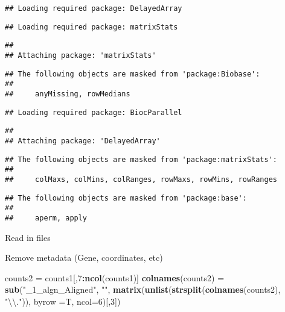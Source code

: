 \documentclass[]{article}
\newenvironment{Shaded}{\begin{snugshade}}{\end{snugshade}}
\newcommand{\KeywordTok}[1]{\textcolor[rgb]{0.13,0.29,0.53}{\textbf{#1}}}
\newcommand{\DataTypeTok}[1]{\textcolor[rgb]{0.13,0.29,0.53}{#1}}
\newcommand{\DecValTok}[1]{\textcolor[rgb]{0.00,0.00,0.81}{#1}}
\newcommand{\CharTok}[1]{\textcolor[rgb]{0.31,0.60,0.02}{#1}}
\newcommand{\StringTok}[1]{\textcolor[rgb]{0.31,0.60,0.02}{#1}}
\newcommand{\OperatorTok}[1]{\textcolor[rgb]{0.81,0.36,0.00}{\textbf{#1}}}
\newcommand{\NormalTok}[1]{#1}
\begin{document}
\begin{verbatim}
## Loading required package: DelayedArray
\end{verbatim}

\begin{verbatim}
## Loading required package: matrixStats
\end{verbatim}

\begin{verbatim}
## 
## Attaching package: 'matrixStats'
\end{verbatim}

\begin{verbatim}
## The following objects are masked from 'package:Biobase':
## 
##     anyMissing, rowMedians
\end{verbatim}

\begin{verbatim}
## Loading required package: BiocParallel
\end{verbatim}

\begin{verbatim}
## 
## Attaching package: 'DelayedArray'
\end{verbatim}

\begin{verbatim}
## The following objects are masked from 'package:matrixStats':
## 
##     colMaxs, colMins, colRanges, rowMaxs, rowMins, rowRanges
\end{verbatim}

\begin{verbatim}
## The following objects are masked from 'package:base':
## 
##     aperm, apply
\end{verbatim}

Read in files

\begin{Shaded}
\end{Shaded}

Remove metadata (Gene, coordinates, etc)

\begin{Shaded}
\begin{Highlighting}[]
\NormalTok{counts2 =}\StringTok{ }\NormalTok{counts1[,}\DecValTok{7}\OperatorTok{:}\KeywordTok{ncol}\NormalTok{(counts1)]}
\KeywordTok{colnames}\NormalTok{(counts2) =}\StringTok{ }\KeywordTok{sub}\NormalTok{(}\StringTok{"_1_algn_Aligned"}\NormalTok{, }\StringTok{""}\NormalTok{, }\KeywordTok{matrix}\NormalTok{(}\KeywordTok{unlist}\NormalTok{(}\KeywordTok{strsplit}\NormalTok{(}\KeywordTok{colnames}\NormalTok{(counts2), }\StringTok{"}\CharTok{\textbackslash{}\textbackslash{}}\StringTok{."}\NormalTok{)), }\DataTypeTok{byrow =}\NormalTok{T, }\DataTypeTok{ncol=}\DecValTok{6}\NormalTok{)[,}\DecValTok{3}\NormalTok{])}
\end{Highlighting}
\end{Shaded}
\end{document}
